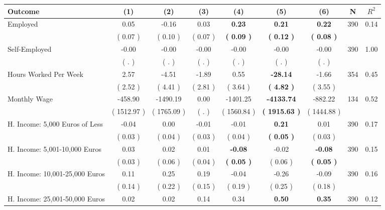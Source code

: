 \begin{tabular}{lcccccccc}
\toprule
 \textbf{Outcome} & \textbf{(1)} & \textbf{(2)} & \textbf{(3)} & \textbf{(4)} & \textbf{(5)} & \textbf{(6)} & \textbf{N} & \textbf{$ R^2$} \\
\midrule
Employed &      0.05 &     -0.16 &      0.03 & \textbf{     0.23} & \textbf{     0.21} & \textbf{     0.22} & 390 &       0.14 \\ 
 & (     0.07 ) & (     0.10 ) & (     0.07 ) & \textbf{(     0.09 )} & \textbf{(     0.12 )} & \textbf{(     0.08 )} & \\
Self-Employed &     -0.00 &     -0.00 &     -0.00 &     -0.00 &     -0.00 &     -0.00 & 390 &       1.00 \\ 
 & (        . ) & (        . ) & (        . ) & (        . ) & (        . ) & (        . ) & \\
Hours Worked Per Week &      2.57 &     -4.51 &     -1.89 &      0.55 & \textbf{   -28.14} &     -1.66 & 354 &       0.45 \\ 
 & (     2.52 ) & (     4.41 ) & (     2.81 ) & (     3.64 ) & \textbf{(     4.82 )} & (     3.55 ) & \\
Monthly Wage &   -458.90 &  -1490.19 &      0.00 &  -1401.25 & \textbf{ -4133.74} &   -882.22 & 134 &       0.52 \\ 
 & (  1512.97 ) & (  1765.09 ) & (        . ) & (  1560.84 ) & \textbf{(  1915.63 )} & (  1444.88 ) & \\
H. Income: 5,000 Euros of Less &     -0.04 &      0.00 &     -0.01 &     -0.01 & \textbf{     0.21} &      0.01 & 390 &       0.17 \\ 
 & (     0.03 ) & (     0.04 ) & (     0.03 ) & (     0.04 ) & \textbf{(     0.05 )} & (     0.03 ) & \\
H. Income: 5,001-10,000 Euros &      0.03 &      0.02 &      0.01 & \textbf{    -0.08} &     -0.02 & \textbf{    -0.08} & 390 &       0.15 \\ 
 & (     0.03 ) & (     0.06 ) & (     0.04 ) & \textbf{(     0.05 )} & (     0.06 ) & \textbf{(     0.05 )} & \\
H. Income: 10,001-25,000 Euros &      0.11 &      0.25 &      0.19 &     -0.04 &     -0.26 &     -0.09 & 390 &       0.16 \\ 
 & (     0.14 ) & (     0.22 ) & (     0.15 ) & (     0.19 ) & (     0.25 ) & (     0.18 ) & \\
H. Income: 25,001-50,000 Euros &      0.02 &      0.02 &      0.14 &      0.34 & \textbf{     0.50} & \textbf{     0.35} & 390 &       0.12 \\ 

\end{tabular}
